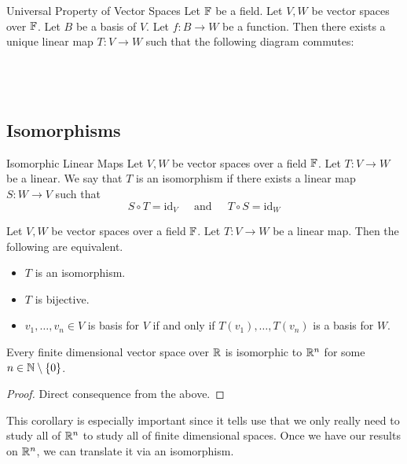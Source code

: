 \documentclass[a4paper]{article}
\begin{document}
\begin{prp}{Universal Property of Vector Spaces}{} Let $\mathbb{F}$ be a field. Let $V,W$ be vector spaces over $\mathbb{F}$. Let $B$ be a basis of $V$. Let $f:B\to W$ be a function. Then there exists a unique linear map $T:V\to W$ such that the following diagram commutes: \\~\\
 \\~\\
\end{prp}

\subsection{Isomorphisms}
\begin{defn}{Isomorphic Linear Maps}{} Let $V,W$ be vector spaces over a field $\mathbb{F}$. Let $T:V\to W$ be a linear. We say that $T$ is an isomorphism if there exists a linear map $S:W\to V$ such that $$S\circ T=\text{id}_V\;\;\;\;\text{ and }\;\;\;\;T\circ S=\text{id}_W$$
\end{defn}

\begin{prp}{}{} Let $V,W$ be vector spaces over a field $\mathbb{F}$. Let $T:V\to W$ be a linear map. Then the following are equivalent. 
\begin{itemize}
\item $T$ is an isomorphism. 
\item $T$ is bijective. 
\item $v_1,\dots,v_n\in V$ is basis for $V$ if and only if $T(v_1),\dots,T(v_n)$ is a basis for $W$. 
\end{itemize}
\end{prp}

\begin{crl}{}{} Every finite dimensional vector space over $\mathbb{R}$ is isomorphic to $\mathbb{R}^n$ for some $n\in\mathbb{N}\setminus\{0\}$. \tcbline
\begin{proof} Direct consequence from the above. 
\end{proof}
\end{crl}

This corollary is especially important since it tells use that we only really need to study all of $\mathbb{R}^n$ to study all of finite dimensional spaces. Once we have our results on $\mathbb{R}^n$, we can translate it via an isomorphism. 
\end{document}
